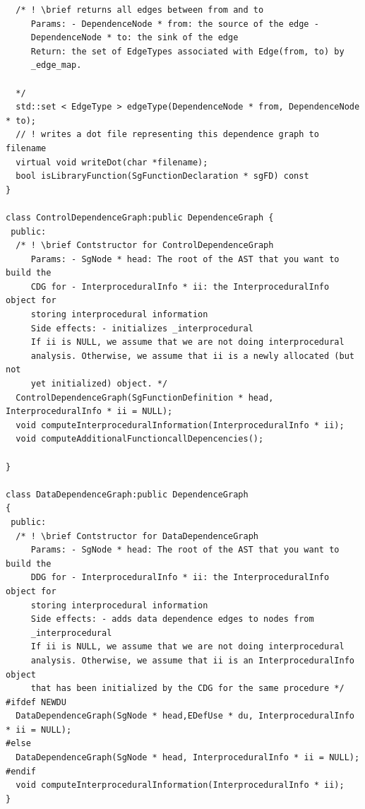 \begin{enumerate}
\begin{enumerate}
\begin{lstlisting}
  /* ! \brief returns all edges between from and to
     Params: - DependenceNode * from: the source of the edge -
     DependenceNode * to: the sink of the edge
     Return: the set of EdgeTypes associated with Edge(from, to) by
     _edge_map.

  */
  std::set < EdgeType > edgeType(DependenceNode * from, DependenceNode * to);
  // ! writes a dot file representing this dependence graph to filename
  virtual void writeDot(char *filename);
  bool isLibraryFunction(SgFunctionDeclaration * sgFD) const
}

class ControlDependenceGraph:public DependenceGraph {
 public:
  /* ! \brief Contstructor for ControlDependenceGraph
     Params: - SgNode * head: The root of the AST that you want to build the 
     CDG for - InterproceduralInfo * ii: the InterproceduralInfo object for
     storing interprocedural information
     Side effects: - initializes _interprocedural
     If ii is NULL, we assume that we are not doing interprocedural
     analysis. Otherwise, we assume that ii is a newly allocated (but not
     yet initialized) object. */
  ControlDependenceGraph(SgFunctionDefinition * head, InterproceduralInfo * ii = NULL);
  void computeInterproceduralInformation(InterproceduralInfo * ii);
  void computeAdditionalFunctioncallDepencencies();

}

class DataDependenceGraph:public DependenceGraph
{
 public:
  /* ! \brief Contstructor for DataDependenceGraph
     Params: - SgNode * head: The root of the AST that you want to build the 
     DDG for - InterproceduralInfo * ii: the InterproceduralInfo object for
     storing interprocedural information
     Side effects: - adds data dependence edges to nodes from
     _interprocedural
     If ii is NULL, we assume that we are not doing interprocedural
     analysis. Otherwise, we assume that ii is an InterproceduralInfo object 
     that has been initialized by the CDG for the same procedure */
#ifdef NEWDU
  DataDependenceGraph(SgNode * head,EDefUse * du, InterproceduralInfo * ii = NULL);
#else
  DataDependenceGraph(SgNode * head, InterproceduralInfo * ii = NULL);
#endif
  void computeInterproceduralInformation(InterproceduralInfo * ii);
}


\end{lstlisting}
\end{enumerate}
\end{enumerate}
